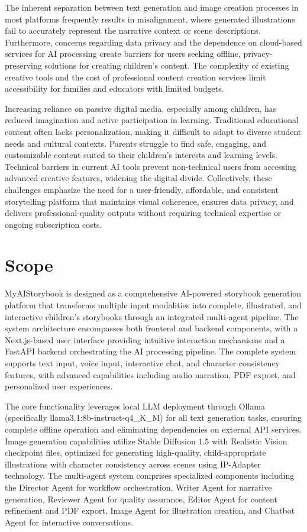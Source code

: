 The inherent separation between text generation and image creation processes in most platforms frequently results in misalignment, where generated illustrations fail to accurately represent the narrative context or scene descriptions. Furthermore, concerns regarding data privacy and the dependence on cloud-based services for AI processing create barriers for users seeking offline, privacy-preserving solutions for creating children's content. The complexity of existing creative tools and the cost of professional content creation services limit accessibility for families and educators with limited budgets.

Increasing reliance on passive digital media, especially among children, has reduced imagination and active participation in learning. Traditional educational content often lacks personalization, making it difficult to adapt to diverse student needs and cultural contexts. Parents struggle to find safe, engaging, and customizable content suited to their children's interests and learning levels. Technical barriers in current AI tools prevent non-technical users from accessing advanced creative features, widening the digital divide. Collectively, these challenges emphasize the need for a user-friendly, affordable, and consistent storytelling platform that maintains visual coherence, ensures data privacy, and delivers professional-quality outputs without requiring technical expertise or ongoing subscription costs.

\section{Scope}

MyAIStorybook is designed as a comprehensive AI-powered storybook generation platform that transforms multiple input modalities into complete, illustrated, and interactive children's storybooks through an integrated multi-agent pipeline. The system architecture encompasses both frontend and backend components, with a Next.js-based user interface providing intuitive interaction mechanisms and a FastAPI backend orchestrating the AI processing pipeline. The complete system supports text input, voice input, interactive chat, and character consistency features, with advanced capabilities including audio narration, PDF export, and personalized user experiences.

The core functionality leverages local LLM deployment through Ollama (specifically llama3.1:8b-instruct-q4\_K\_M) for all text generation tasks, ensuring complete offline operation and eliminating dependencies on external API services. Image generation capabilities utilize Stable Diffusion 1.5 with Realistic Vision checkpoint files, optimized for generating high-quality, child-appropriate illustrations with character consistency across scenes using IP-Adapter technology. The multi-agent system comprises specialized components including the Director Agent for workflow orchestration, Writer Agent for narrative generation, Reviewer Agent for quality assurance, Editor Agent for content refinement and PDF export, Image Agent for illustration creation, and Chatbot Agent for interactive conversations.

